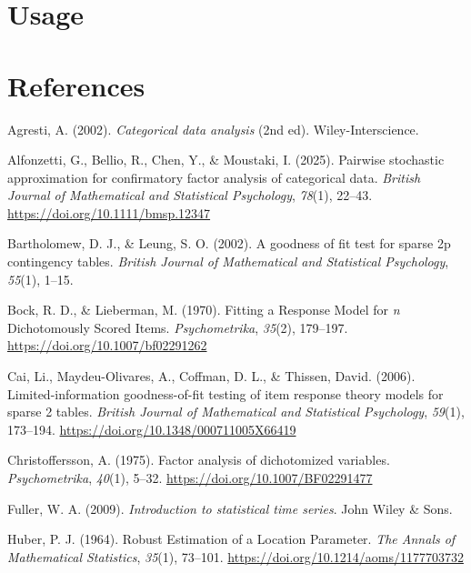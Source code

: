\documentclass[
  letterpaper,
  DIV=11,
  numbers=noendperiod]{scrartcl}
\newlength{\cslhangindent}
\newenvironment{CSLReferences}[2] %
 {\begin{list}{}{%
  \setlength{\itemindent}{0pt}
  \setlength{\leftmargin}{0pt}
  \setlength{\parsep}{0pt}
  \ifodd #1
   \setlength{\leftmargin}{\cslhangindent}
   \setlength{\itemindent}{-1\cslhangindent}
  \fi
  \setlength{\itemsep}{#2\baselineskip}}}
 {\end{list}}
\begin{document}
\section{Usage}\label{usage}

\section*{References}\label{references}

\label{refs}
\begin{CSLReferences}{1}{0}
Agresti, A. (2002). \emph{Categorical data analysis} (2nd ed).
Wiley-Interscience.

Alfonzetti, G., Bellio, R., Chen, Y., \& Moustaki, I. (2025). Pairwise
stochastic approximation for confirmatory factor analysis of categorical
data. \emph{British Journal of Mathematical and Statistical Psychology},
\emph{78}(1), 22--43. \url{https://doi.org/10.1111/bmsp.12347}

Bartholomew, D. J., \& Leung, S. O. (2002). A goodness of fit test for
sparse 2p contingency tables. \emph{British Journal of Mathematical and
Statistical Psychology}, \emph{55}(1), 1--15.

Bock, R. D., \& Lieberman, M. (1970). Fitting a {Response Model} for
{\emph{n}} {Dichotomously Scored Items}. \emph{Psychometrika},
\emph{35}(2), 179--197. \url{https://doi.org/10.1007/bf02291262}

Cai, Li., Maydeu-Olivares, A., Coffman, D. L., \& Thissen, David.
(2006). Limited-information goodness-of-fit testing of item response
theory models for sparse 2 tables. \emph{British Journal of Mathematical
and Statistical Psychology}, \emph{59}(1), 173--194.
\url{https://doi.org/10.1348/000711005X66419}

Christoffersson, A. (1975). Factor analysis of dichotomized variables.
\emph{Psychometrika}, \emph{40}(1), 5--32.
\url{https://doi.org/10.1007/BF02291477}

Fuller, W. A. (2009). \emph{Introduction to statistical time series}.
John Wiley \& Sons.

Huber, P. J. (1964). Robust {Estimation} of a {Location Parameter}.
\emph{The Annals of Mathematical Statistics}, \emph{35}(1), 73--101.
\url{https://doi.org/10.1214/aoms/1177703732}


\end{CSLReferences}
\end{document}
